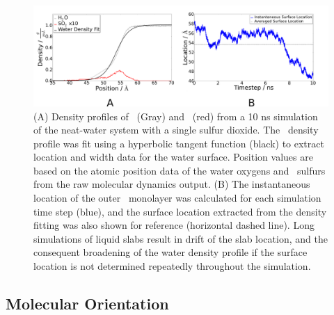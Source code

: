 \begin{figure}[h!]
	\begin{center}
		\includegraphics[scale=1.0]{images/density/density-location.png}
		\caption{(A) Density profiles of \wat~(Gray) and \suldiox~(red) from a 10 ns simulation of the neat-water system with a single sulfur dioxide. The \wat~density profile was fit using a hyperbolic tangent function (black) to extract location and width data for the water surface. Position values are based on the atomic position data of the water oxygens and \suldiox~sulfurs from the raw molecular dynamics output. (B) The instantaneous location of the outer \wat~monolayer was calculated for each simulation time step (blue), and the surface location extracted from the density fitting was also shown for reference (horizontal dashed line). Long simulations of liquid slabs result in drift of the slab location, and the consequent broadening of the water density profile if the surface location is not determined repeatedly throughout the simulation.}
		\label{fig:density-flaw}
	\end{center}
\end{figure}




\subsection{Molecular Orientation}

